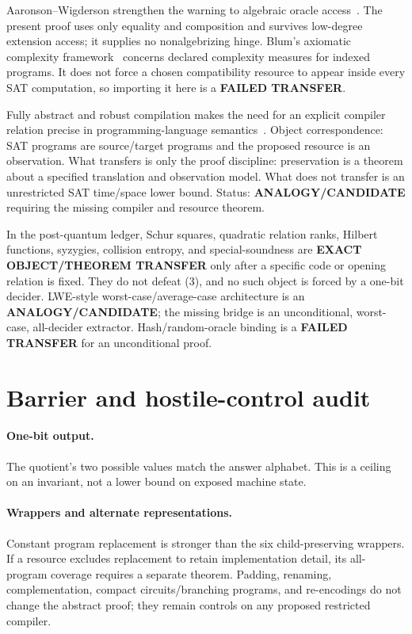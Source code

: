 \documentclass[11pt]{article}
\begin{document}
Aaronson--Wigderson strengthen the warning to algebraic oracle
access~\cite{AW09}.  The present proof uses only equality and composition and
survives low-degree extension access; it supplies no nonalgebrizing hinge.
Blum's axiomatic complexity framework~\cite{Blum67} concerns declared
complexity measures for indexed programs.  It does not force a chosen
compatibility resource to appear inside every SAT computation, so importing
it here is a \textbf{FAILED TRANSFER}.

Fully abstract and robust compilation makes the need for an explicit
compiler relation precise in programming-language semantics~\cite{Abate18}.
Object correspondence: SAT programs are source/target programs and the
proposed resource is an observation.  What transfers is only the proof
discipline: preservation is a theorem about a specified translation and
observation model.  What does not transfer is an unrestricted SAT
time/space lower bound.  Status: \textbf{ANALOGY/CANDIDATE} requiring the
missing compiler and resource theorem.

In the post-quantum ledger, Schur squares, quadratic relation ranks, Hilbert
functions, syzygies, collision entropy, and special-soundness are
\textbf{EXACT OBJECT/THEOREM TRANSFER} only after a specific code or opening
relation is fixed.  They do not defeat (3), and no such object is forced by a
one-bit decider.  LWE-style worst-case/average-case architecture is an
\textbf{ANALOGY/CANDIDATE}; the missing bridge is an unconditional,
worst-case, all-decider extractor.  Hash/random-oracle binding is a
\textbf{FAILED TRANSFER} for an unconditional proof.

\section{Barrier and hostile-control audit}

\paragraph{One-bit output.}
The quotient's two possible values match the answer alphabet.  This is a
ceiling on an invariant, not a lower bound on exposed machine state.

\paragraph{Wrappers and alternate representations.}
Constant program replacement is stronger than the six child-preserving
wrappers.  If a resource excludes replacement to retain implementation
detail, its all-program coverage requires a separate theorem.  Padding,
renaming, complementation, compact circuits/branching programs, and
re-encodings do not change the abstract proof; they remain controls on any
proposed restricted compiler.
\end{document}
